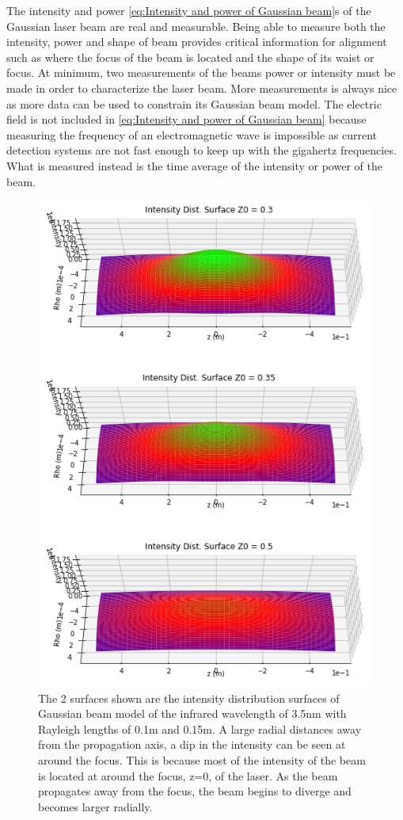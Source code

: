 \documentclass[11pt,a4paper]{book}
\begin{document}
		The intensity and power \autoref{eq:Intensity and power of Gaussian beam}s of the Gaussian laser beam are real and measurable. Being able to measure both the intensity, power and shape of beam provides critical information for alignment such as where the focus of the beam is located and the shape of its waist or focus. At minimum, two measurements of the beams power or intensity must be made in order to characterize the laser beam. More measurements is always nice as more data can be used to constrain its Gaussian beam model. The electric field is not included in \autoref{eq:Intensity and power of Gaussian beam} because measuring the frequency of an electromagnetic wave is impossible as current detection systems are not fast enough to keep up with the gigahertz frequencies. What is measured instead is the time average of the intensity or power of the beam. 
		
		\begin{figure} 
		\centering
		\includegraphics[scale=0.85]{images/chapter-3/Intensities_Distribution_3ds.png}
		\caption{The 2 surfaces shown are the intensity distribution surfaces of Gaussian beam model of the infrared wavelength of 3.5nm with Rayleigh lengths of 0.1m and 0.15m. A large radial distances away from the propagation axis, a dip in the intensity can be seen at around the focus. This is because most of the intensity of the beam is located at around the focus, z=0, of the laser. As the beam propagates away from the focus, the beam begins to diverge and becomes larger radially.}
		\label{fig:Intensities_Distribution_3d}	
		\end{figure}
		
\end{document}

